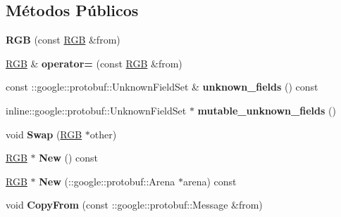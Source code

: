 \subsection*{Métodos Públicos}
\begin{DoxyCompactItemize}
\item 
{\bfseries R\+GB} (const \hyperlink{classvss__state_1_1RGB}{R\+GB} \&from)\hypertarget{classvss__state_1_1RGB_ad057f22713ee486fa88d59661f15c390}{}\label{classvss__state_1_1RGB_ad057f22713ee486fa88d59661f15c390}

\item 
\hyperlink{classvss__state_1_1RGB}{R\+GB} \& {\bfseries operator=} (const \hyperlink{classvss__state_1_1RGB}{R\+GB} \&from)\hypertarget{classvss__state_1_1RGB_ae6850f3550d012f10cb3fe961ceca13a}{}\label{classvss__state_1_1RGB_ae6850f3550d012f10cb3fe961ceca13a}

\item 
const \+::google\+::protobuf\+::\+Unknown\+Field\+Set \& {\bfseries unknown\+\_\+fields} () const \hypertarget{classvss__state_1_1RGB_af3633b5c052c9b983f03dca86c5172e3}{}\label{classvss__state_1_1RGB_af3633b5c052c9b983f03dca86c5172e3}

\item 
inline\+::google\+::protobuf\+::\+Unknown\+Field\+Set $\ast$ {\bfseries mutable\+\_\+unknown\+\_\+fields} ()\hypertarget{classvss__state_1_1RGB_adfdaca9126b92f913d030d86975fb390}{}\label{classvss__state_1_1RGB_adfdaca9126b92f913d030d86975fb390}

\item 
void {\bfseries Swap} (\hyperlink{classvss__state_1_1RGB}{R\+GB} $\ast$other)\hypertarget{classvss__state_1_1RGB_a42f05e54d0dc837400c5079899b463aa}{}\label{classvss__state_1_1RGB_a42f05e54d0dc837400c5079899b463aa}

\item 
\hyperlink{classvss__state_1_1RGB}{R\+GB} $\ast$ {\bfseries New} () const \hypertarget{classvss__state_1_1RGB_af84170737e8c4116c9a2f85dc11a3503}{}\label{classvss__state_1_1RGB_af84170737e8c4116c9a2f85dc11a3503}

\item 
\hyperlink{classvss__state_1_1RGB}{R\+GB} $\ast$ {\bfseries New} (\+::google\+::protobuf\+::\+Arena $\ast$arena) const \hypertarget{classvss__state_1_1RGB_a275fa538a9a801635e12e94d188acf82}{}\label{classvss__state_1_1RGB_a275fa538a9a801635e12e94d188acf82}

\item 
void {\bfseries Copy\+From} (const \+::google\+::protobuf\+::\+Message \&from)\hypertarget{classvss__state_1_1RGB_a7dca7dca78106990bae0191f4fc58aa3}{}\label{classvss__state_1_1RGB_a7dca7dca78106990bae0191f4fc58aa3}


\end{DoxyCompactItemize}

